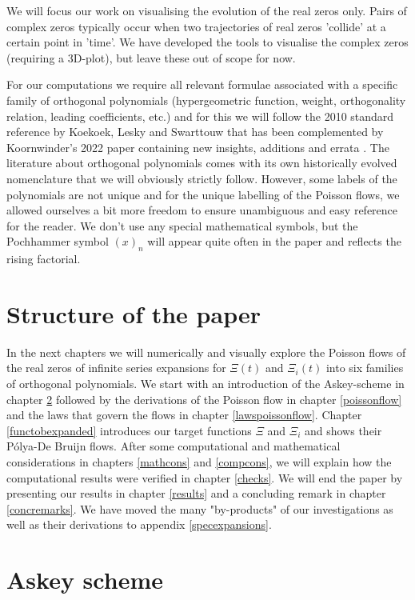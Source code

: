 \documentclass[a4paper,11pt,twoside]{amsart}
\begin{document}
We will focus our work on visualising the evolution of the real zeros only. Pairs of complex zeros typically occur when two trajectories of real zeros 'collide' at a certain point in 'time'. We have developed the tools to visualise the complex zeros (requiring a 3D-plot), but leave these out of scope for now. 

For our computations we require all relevant formulae  associated with a specific family of orthogonal polynomials (hypergeometric function, weight, orthogonality relation, leading coefficients, etc.) and for this we will follow the 2010 standard reference by Koekoek, Lesky and Swarttouw \cite{koe} that has been complemented by Koornwinder's 2022 paper containing new insights, additions and errata \cite{koesup}. The literature about orthogonal polynomials comes with its own historically evolved nomenclature that we will obviously strictly follow. However, some labels of the polynomials are not unique and for the unique labelling of the Poisson flows, we allowed ourselves a bit more freedom to ensure unambiguous and easy reference for the reader. We don't use any special mathematical symbols, but the Pochhammer symbol $(x)_n$ will appear quite often in the paper and reflects the rising factorial.

\section{Structure of the paper}
In the next chapters we will numerically and visually explore the Poisson flows of the real zeros of infinite series expansions for $\Xi(t)$ and $\Xi_i(t)$ into six families of orthogonal polynomials. We start with an introduction of the Askey-scheme in chapter \ref{askeyscheme} followed by the derivations of the Poisson flow in chapter \ref{poissonflow} and the laws that govern the flows in chapter \ref{lawspoissonflow}. Chapter \ref{functobexpanded} introduces our target functions $\Xi$ and $\Xi_i$ and shows their Pólya-De Bruijn flows. After some computational and mathematical considerations in chapters \ref{mathcons} and \ref{compcons}, we will explain how the computational results were verified in chapter \ref{checks}. We will end the paper by presenting our results in chapter \ref{results} and a concluding remark in chapter \ref{concremarks}. We have moved the many "by-products" of our investigations as well as their derivations to appendix \ref{specexpansions}. 

\pagebreak
\section{Askey scheme}\label{askeyscheme}
\end{document}
